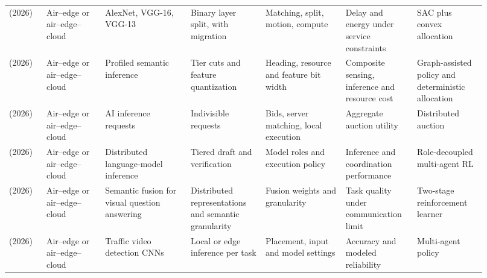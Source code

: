 \begin{longtable}{@{}Y{0.075\linewidth}Y{0.111\linewidth}Y{0.169\linewidth}Y{0.145\linewidth}Y{0.151\linewidth}Y{0.125\linewidth}Y{0.139\linewidth}@{}}
\cite{R0045} (2026) & Air--edge or air--edge--cloud & AlexNet, VGG-16, VGG-13 & Binary layer split, with migration & Matching, split, motion, compute & Delay and energy under service constraints & SAC plus convex allocation \\
\cite{R0054} (2026) & Air--edge or air--edge--cloud & Profiled semantic inference & Tier cuts and feature quantization & Heading, resource and feature bit width & Composite sensing, inference and resource cost & Graph-assisted policy and deterministic allocation \\
\cite{R0058} (2026) & Air--edge or air--edge--cloud & AI inference requests & Indivisible requests & Bids, server matching, local execution & Aggregate auction utility & Distributed auction \\
\cite{R0063} (2026) & Air--edge or air--edge--cloud & Distributed language-model inference & Tiered draft and verification & Model roles and execution policy & Inference and coordination performance & Role-decoupled multi-agent RL \\
\cite{R0107} (2026) & Air--edge or air--edge--cloud & Semantic fusion for visual question answering & Distributed representations and semantic granularity & Fusion weights and granularity & Task quality under communication limit & Two-stage reinforcement learner \\
\cite{R0137} (2026) & Air--edge or air--edge--cloud & Traffic video detection CNNs & Local or edge inference per task & Placement, input and model settings & Accuracy and modeled reliability & Multi-agent policy \\
\end{longtable}\endgroup
